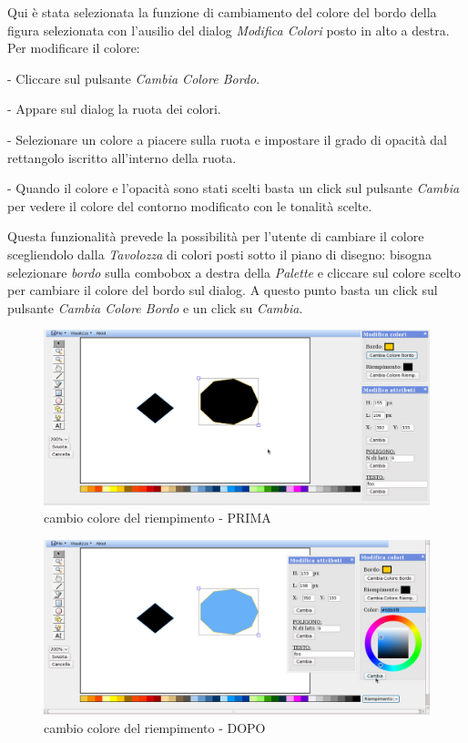  
\vspace{100pt}
Qui \`e stata selezionata la funzione di cambiamento del colore del bordo della figura selezionata con l'ausilio del dialog \textit{Modifica Colori} posto in alto a destra. Per modificare il colore:
\begin{elencopuntato}[\normindent]
\item[-] Cliccare sul pulsante \textit{Cambia Colore Bordo}.
\item[-] Appare sul dialog la ruota dei colori.
\item[-] Selezionare un colore a piacere sulla ruota e impostare il grado di opacit\`a dal rettangolo iscritto all'interno della ruota.
\item[-]Quando il colore e l'opacit\`a sono stati scelti basta un click sul pulsante \textit{Cambia} per vedere il colore del contorno modificato con le tonalit\`a scelte.
\end{elencopuntato}
Questa funzionalit\`a prevede la possibilit\`a per l'utente di cambiare il colore scegliendolo dalla \textit{Tavolozza} di colori posti sotto il piano di disegno: bisogna selezionare \textit{bordo} sulla combobox a destra della \textit{Palette} e cliccare sul colore scelto per cambiare il colore del bordo sul dialog. A questo punto basta un click sul pulsante \textit{Cambia Colore Bordo} e un click su \textit{Cambia}.
 
\begin{figure}[!ht]
\centering
\includegraphics[scale=0.4]{images/colore_riempimento_prima.png}
\caption{cambio colore del riempimento - PRIMA}
\end{figure}
 
\begin{figure}[!ht]
\centering
\includegraphics[scale=0.4]{images/colore_riempimento_dopo.png}
\caption{cambio colore del riempimento - DOPO}
\end{figure}
 
